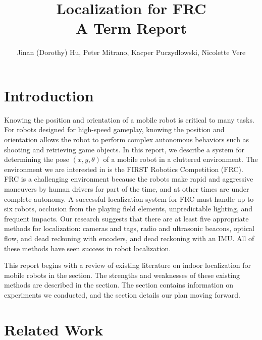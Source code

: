 \documentclass{article}
\begin{document}
\title{Localization for FRC \\
  \large{A Term Report}
  }
\author{Jinan (Dorothy) Hu, Peter Mitrano, Kacper Puczydlowski, Nicolette Vere}

\maketitle{}

\section{Introduction}

Knowing the position and orientation of a mobile robot is critical to many tasks. For robots designed for high-speed gameplay, knowing the position and orientation allows the robot to perform complex autonomous behaviors such as shooting and retrieving game objects. In this report, we describe a system for determining the pose $(x, y, \theta)$ of a mobile robot in a cluttered environment. The environment we are interested in is the FIRST Robotics Competition (FRC). FRC is a challenging environment because the robots make rapid and aggressive maneuvers by human drivers for part of the time, and at other times are under complete autonomy. A successful localization system for FRC must handle up to six robots, occlusion from the playing field elements, unpredictable lighting, and frequent impacts. Our research suggests that there are at least five appropriate methods for localization: cameras and tags, radio and ultrasonic beacons, optical flow, and dead reckoning with encoders, and dead reckoning with an IMU. All of these methods have seen success in robot localization.

This report begins with a review of existing literature on indoor localization for mobile robots in the  section. The strengths and weaknesses of these existing methods are described in the  section. The  section contains information on experiments we conducted, and the  section details our plan moving forward.

\section{Related Work} \label{related_work}

\end{document}
